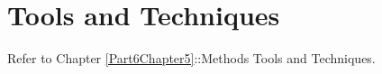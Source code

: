 
\chapter{Tools and Techniques} %

\label{Part4Chapter6} %


Refer to Chapter \ref{Part6Chapter5}::Methods Tools and Techniques.